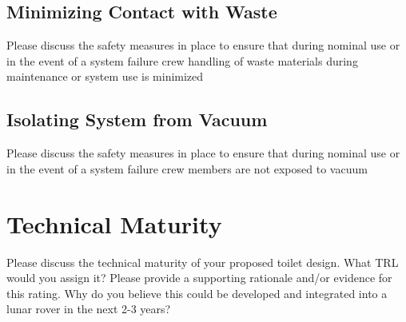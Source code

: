     \subsection{Minimizing Contact with Waste}
    Please discuss the safety measures in place to ensure that during nominal use or in the event of a system failure crew handling of waste materials during maintenance or system use is minimized

    \subsection{Isolating System from Vacuum}
    Please discuss the safety measures in place to ensure that during nominal use or in the event of a system failure crew members are not exposed to vacuum

\pagebreak
\section{Technical Maturity}
    Please discuss the technical maturity of your proposed toilet design. What TRL would you assign it? Please provide a supporting rationale and/or evidence for this rating. Why do you believe this could be developed and integrated into a lunar rover in the next 2-3 years?